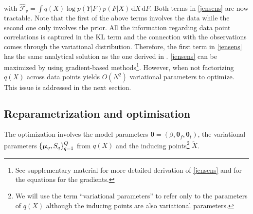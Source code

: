 \documentclass{article} %
\begin{document}
%
with $\hat{\mathcal{F}}_v =\int q(X) \log p( Y | F ) p( F | X) \,
\mathrm{d} X \,\mathrm{d}F$. Both terms in \eqref{jensens} are now
tractable. Note that the first of the above terms involves the data while
the second one only involves the prior. All the information regarding
data point correlations is captured in the $\text{KL}$ term and the
connection with the observations comes through the variational
distribution. Therefore, the first term in \eqref{jensens} has the
same analytical solution as the one derived in \cite{BayesianGPLVM}.
%
\eqref{jensens} can be maximized by using gradient-based
methods\footnote{See supplementary material for more detailed
  derivation of \eqref{jensens} and for the equations for the
  gradients.}. However, when not factorizing $q(X)$ across data points
yields $O(N^2)$ variational parameters to optimize. 
This issue is addressed in the next section.



\subsection{Reparametrization and optimisation \label{optimisation}} 

The optimization involves the model parameters $\boldsymbol \theta =
(\beta, \boldsymbol \theta_f, \boldsymbol \theta_t)$, the variational
parameters $\{ \boldsymbol \mu_q, S_q \}_{q=1}^Q$ from $q(X)$ and the inducing
points\footnote{We will use the term ``variational parameters'' to
  refer only to the parameters of $q(X)$ although the inducing points
  are also variational parameters.} $\tilde{X}$.
\end{document}
